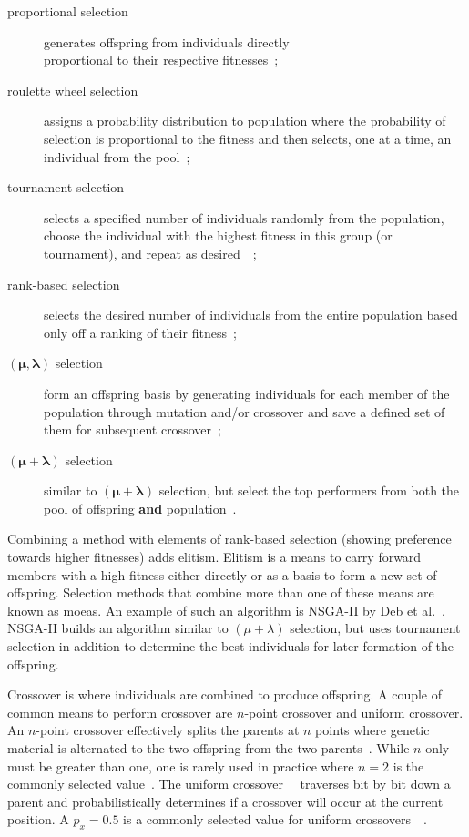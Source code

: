 \begin{description}
\item[proportional selection] generates offspring from individuals directly \\ proportional to their respective fitnesses~\cite{Holland1975-di};
\item[roulette wheel selection] assigns a probability distribution to population where the probability of selection is proportional to the fitness and then selects, one at a time, an individual from the pool~\cite{Baeck2000-co};
\item[tournament selection] selects a specified number of individuals randomly from the population, choose the individual with the highest fitness in this group (or tournament), and repeat as desired~\cite{Brindle1981-rh}~\cite{Goldberg1991-kr};
\item[rank-based selection] selects the desired number of individuals from the entire population based only off a ranking of their fitness~\cite{Baker1985-fw};
\item[$\bm{(\mu, \lambda)}$ selection] form an offspring basis by generating individuals for each member of the population through mutation and/or crossover and save a defined set of them for subsequent crossover~\cite{Schwefel1976-er};
\item[$\bm{(\mu + \lambda)}$ selection] similar to $\bm{(\mu + \lambda)}$ selection, but select the top performers from both the pool of offspring \textbf{and} population~\cite{Schwefel1976-er}.
\end{description}

Combining a method with elements of rank-based selection (showing preference towards higher fitnesses) adds elitism. Elitism is a means to carry forward  members with a high fitness either directly or as a basis to form a new set of offspring. Selection methods that combine more than one of these means are known as \glspl{moea}. An example of such an algorithm is NSGA-II by Deb et al.~\cite{Deb2000-so}. NSGA-II builds an algorithm similar to $(\mu + \lambda)$ selection, but uses tournament selection in addition to determine the best individuals for later formation of the offspring.

Crossover is where individuals are combined to produce offspring. A couple of common means to perform crossover are $n$-point crossover and uniform crossover. An $n$-point crossover effectively splits the parents at $n$ points where genetic material is alternated to the two offspring from the two parents~\cite{De_Jong1975-wc}. While $n$ only must be greater than one, one is rarely used in practice where $n = 2$ is the commonly selected value~\cite{Baeck2000-co}. The uniform crossover~\cite{Ackley1987-xa}~\cite{Syswerda1989-go} traverses bit by bit down a parent and probabilistically determines if a crossover will occur at the current position. A $p_x = 0.5$ is a commonly selected value for uniform crossovers~\cite{Baeck2000-co}~\cite{Ackley1987-xa}.

